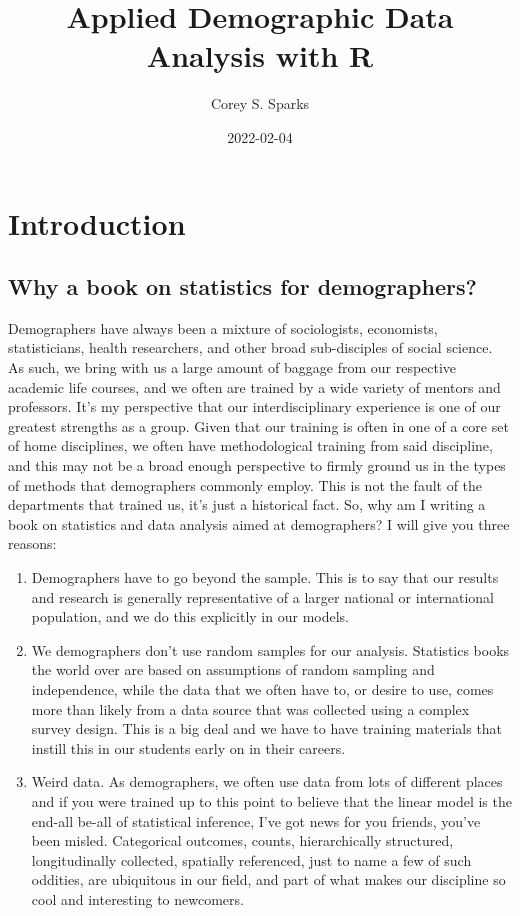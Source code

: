 \documentclass[
]{article}
\title{Applied Demographic Data Analysis with R}
\author{Corey S. Sparks}
\date{2022-02-04}
\begin{document}
\maketitle

{
\setcounter{tocdepth}{2}
\tableofcontents
}
\hypertarget{introduction}{%
\section*{Introduction}\label{introduction}}

\hypertarget{why-a-book-on-statistics-for-demographers}{%
\subsection{Why a book on statistics for demographers?}\label{why-a-book-on-statistics-for-demographers}}

Demographers have always been a mixture of sociologists, economists, statisticians, health researchers, and other broad sub-disciples of social science. As such, we bring with us a large amount of baggage from our respective academic life courses, and we often are trained by a wide variety of mentors and professors. It's my perspective that our interdisciplinary experience is one of our greatest strengths as a group. Given that our training is often in one of a core set of home disciplines, we often have methodological training from said discipline, and this may not be a broad enough perspective to firmly ground us in the types of methods that demographers commonly employ. This is not the fault of the departments that trained us, it's just a historical fact. So, why am I writing a book on statistics and data analysis aimed at demographers? I will give you three reasons:

\begin{enumerate}
\def\labelenumi{\arabic{enumi}.}
\item
  Demographers have to go beyond the sample. This is to say that our results and research is generally representative of a larger national or international population, and we do this explicitly in our models.
\item
  We demographers don't use random samples for our analysis. Statistics books the world over are based on assumptions of random sampling and independence, while the data that we often have to, or desire to use, comes more than likely from a data source that was collected using a complex survey design. This is a big deal and we have to have training materials that instill this in our students early on in their careers.
\item
  Weird data. As demographers, we often use data from lots of different places and if you were trained up to this point to believe that the linear model is the end-all be-all of statistical inference, I've got news for you friends, you've been misled. Categorical outcomes, counts, hierarchically structured, longitudinally collected, spatially referenced, just to name a few of such oddities, are ubiquitous in our field, and part of what makes our discipline so cool and interesting to newcomers.
\end{enumerate}
\end{document}
